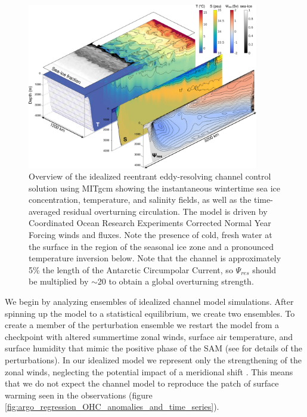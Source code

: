 \documentclass{ametsocV5}
\begin{document}
\begin{figure}[!ht]
    \begin{center}
        \includegraphics[width=0.9\textwidth]{figures/channel_3d_nobox.png}
        \caption{Overview of the idealized reentrant eddy-resolving channel control solution using MITgcm \citep{Marshall1997,Marshall1997b} showing the instantaneous wintertime sea ice concentration, temperature, and salinity fields, as well as the time-averaged residual overturning circulation. The model is driven by Coordinated Ocean Research Experiments Corrected Normal Year Forcing winds and fluxes. Note the presence of cold, fresh water at the surface in the region of the seasonal ice zone and a pronounced temperature inversion below. Note that the channel is approximately 5\% the length of the Antarctic Circumpolar Current, so $\Psi_{res}$ should be multiplied by $\sim$20 to obtain a global overturning strength.}
        \label{fig:channel_overview}
    \end{center}
\end{figure}


We begin by analyzing ensembles of idealized channel model simulations. After spinning up the model to a statistical equilibrium, we create two ensembles. To create a member of the perturbation ensemble we restart the model from a checkpoint with altered summertime zonal winds, surface air temperature, and surface humidity that mimic the positive phase of the SAM (see \citet{Doddridge2019a} for details of the perturbations). In our idealized model we represent only the strengthening of the zonal winds, neglecting the potential impact of a meridional shift \citep[c.f.][]{Waugh2019}. This means that we do not expect the channel model to reproduce the patch of surface warming seen in the observations (figure \ref{fig:argo_regression_OHC_anomalies_and_time_series}).
\end{document}
